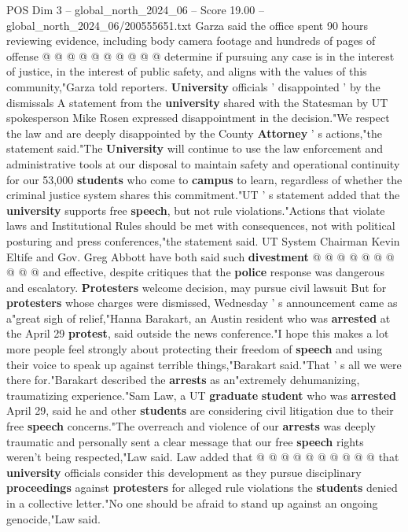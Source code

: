 \begin{textsample}{POS Dim 3 – global\_north\_2024\_06 – Score 19.00 – global\_north\_2024\_06/200555651.txt}
Garza said the office spent 90 hours reviewing evidence, including body camera footage and hundreds of pages of offense @ @ @ @ @ @ @ @ @ @ determine if pursuing any case is in the interest of justice, in the interest of public safety, and aligns with the values of this community,"Garza told reporters. \textbf{University} officials ' disappointed ' by the dismissals A statement from the \textbf{university} shared with the Statesman by UT spokesperson Mike Rosen expressed disappointment in the decision."We respect the law and are deeply disappointed by the County \textbf{Attorney} ' s actions,"the statement said."The \textbf{University} will continue to use the law enforcement and administrative tools at our disposal to maintain safety and operational continuity for our 53,000 \textbf{students} who come to \textbf{campus} to learn, regardless of whether the criminal justice system shares this commitment."UT ' s statement added that the \textbf{university} supports free \textbf{speech}, but not rule violations."Actions that violate laws and Institutional Rules should be met with consequences, not with political posturing and press conferences,"the statement said.
UT System Chairman Kevin Eltife and Gov.
Greg Abbott have both said such \textbf{divestment} @ @ @ @ @ @ @ @ @ @ and effective, despite critiques that the \textbf{police} response was dangerous and escalatory. \textbf{Protesters} welcome decision, may pursue civil lawsuit But for \textbf{protesters} whose charges were dismissed, Wednesday ' s announcement came as a"great sigh of relief,"Hanna Barakart, an Austin resident who was \textbf{arrested} at the April 29 \textbf{protest}, said outside the news conference."I hope this makes a lot more people feel strongly about protecting their freedom of \textbf{speech} and using their voice to speak up against terrible things,"Barakart said."That ' s all we were there for."Barakart described the \textbf{arrests} as an"extremely dehumanizing, traumatizing experience."Sam Law, a UT \textbf{graduate} \textbf{student} who was \textbf{arrested} April 29, said he and other \textbf{students} are considering civil litigation due to their free \textbf{speech} concerns."The overreach and violence of our \textbf{arrests} was deeply traumatic and personally sent a clear message that our free \textbf{speech} rights weren't being respected,"Law said.
Law added that @ @ @ @ @ @ @ @ @ @ that \textbf{university} officials consider this development as they pursue disciplinary \textbf{proceedings} against \textbf{protesters} for alleged rule violations the \textbf{students} denied in a collective letter."No one should be afraid to stand up against an ongoing genocide,"Law said.

\end{textsample}
